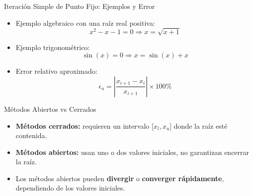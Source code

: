 \documentclass[../../main.tex]{subfiles}
\begin{document}
\begin{frame}{Iteración Simple de Punto Fijo: Ejemplos y Error}
\begin{itemize}
  \item Ejemplo algebraico con una raíz real positiva:
  \[ x^2 - x - 1 = 0 \Rightarrow x = \sqrt{x+1} \]
  \item Ejemplo trigonométrico:
  \[ \sin(x) = 0 \Rightarrow x = \sin(x) + x \]
  \item Error relativo aproximado:
  \[ \epsilon_a = \left| \frac{x_{i+1} - x_i}{x_{i+1}} \right| \times 100\% \]
\end{itemize}
\end{frame}


\begin{frame}{Métodos Abiertos vs Cerrados}
\begin{itemize}
  \item \textbf{Métodos cerrados:} requieren un intervalo [\( x_l, x_u \)] donde la raíz esté contenida.
  \item \textbf{Métodos abiertos:} usan uno o dos valores iniciales, no garantizan encerrar la raíz.
  \item Los métodos abiertos pueden \textbf{divergir} o \textbf{converger rápidamente}, dependiendo de los valores iniciales.
\end{itemize}
\end{frame}
\end{document}
